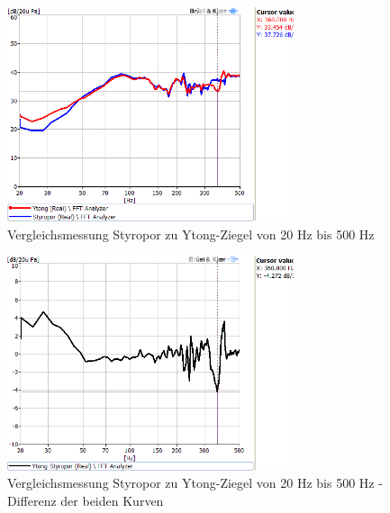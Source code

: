 \begin{figure} [H]
	\centering
	\includegraphics[width=0.75\textwidth]{img/Optimierung/Vergleich/VergleichYtognStyro_500Hz.png}
	\caption{Vergleichsmessung Styropor zu Ytong-Ziegel von 20 Hz bis 500 Hz}
	\label{fig:4.4.1.3}
\end{figure}
\begin{figure} [H]
	\centering
	\includegraphics[width=0.75\textwidth]{img/Optimierung/Vergleich/VergleichYtognStyro_Abweichung_500Hz.png}
	\caption{Vergleichsmessung Styropor zu Ytong-Ziegel von 20 Hz bis 500 Hz - Differenz der beiden Kurven}
	\label{fig:4.4.1.4}
\end{figure}


